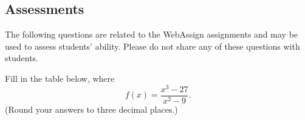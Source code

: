 \documentclass[12pt,addpoints, answers, fleqn]{exam}
\begin{document}
\begin{teacher}
\subsection{Assessments}
The following questions are related to the WebAssign assignments and may be used to assess students' ability. Please do not share any of these questions with students.
\begin{questions}	
\question 	%

Fill in the table below, where
\[
f\left(x\right) = \frac{ x^3 - 27}{x^2 - 9}.
\]
(Round your answers to three decimal places.)
\end{questions}
\end{teacher}
\end{document}
